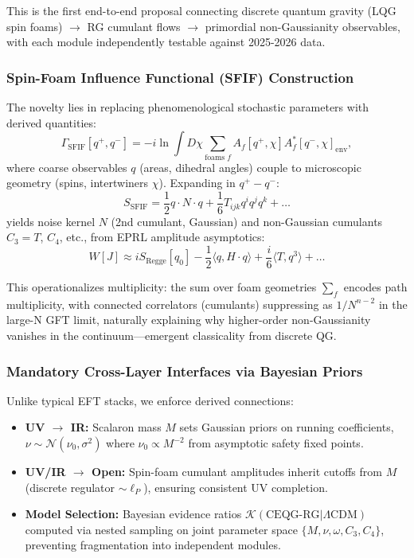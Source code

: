 \documentclass[12pt,a4paper]{article}
\begin{document}
This is the first end-to-end proposal connecting discrete quantum gravity (LQG spin foams) \(\to\) RG cumulant flows \(\to\) primordial non-Gaussianity observables, with each module independently testable against 2025-2026 data.

\subsubsection{Spin-Foam Influence Functional (SFIF) Construction}

The novelty lies in replacing phenomenological stochastic parameters with derived quantities:
\begin{equation}
\Gamma_{\text{SFIF}}[q^+, q^-] = -i\ln \int D\chi \sum_{\text{foams } f} A_f[q^+, \chi] A_f^*[q^-, \chi]_{\text{env}},
\end{equation}
where coarse observables \(q\) (areas, dihedral angles) couple to microscopic geometry (spins, intertwiners \(\chi\)). Expanding in \(q^+ - q^-\):
\begin{equation}
S_{\text{SFIF}} = \frac{1}{2} q \cdot N \cdot q + \frac{1}{6} T_{ijk} q^i q^j q^k + \ldots
\end{equation}
yields noise kernel \(N\) (2nd cumulant, Gaussian) and non-Gaussian cumulants \(C_3 = T\), \(C_4\), etc., from EPRL amplitude asymptotics:
\begin{equation}
W[J] \approx iS_{\text{Regge}}[q_0] - \frac{1}{2} \langle q, H \cdot q \rangle + \frac{i}{6} \langle T, q^3 \rangle + \ldots
\end{equation}

This operationalizes multiplicity: the sum over foam geometries \(\sum_f\) encodes path multiplicity, with connected correlators (cumulants) suppressing as \(1/N^{n-2}\) in the large-N GFT limit, naturally explaining why higher-order non-Gaussianity vanishes in the continuum—emergent classicality from discrete QG.

\subsubsection{Mandatory Cross-Layer Interfaces via Bayesian Priors}

Unlike typical EFT stacks, we enforce derived connections:

\begin{itemize}
\item \textbf{UV \(\to\) IR:} Scalaron mass \(M\) sets Gaussian priors on running coefficients, \(\nu \sim \mathcal{N}(\nu_0, \sigma^2)\) where \(\nu_0 \propto M^{-2}\) from asymptotic safety fixed points.

\item \textbf{UV/IR \(\to\) Open:} Spin-foam cumulant amplitudes inherit cutoffs from \(M\) (discrete regulator \(\sim \ell_P\)), ensuring consistent UV completion.

\item \textbf{Model Selection:} Bayesian evidence ratios \(\mathcal{K}(\text{CEQG-RG} | \Lambda\text{CDM})\) computed via nested sampling on joint parameter space \(\{M, \nu, \omega, C_3, C_4\}\), preventing fragmentation into independent modules.
\end{itemize}
\end{document}
